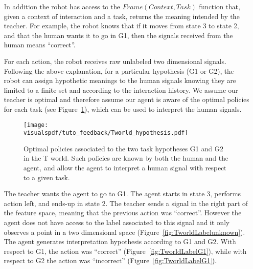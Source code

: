 In addition the robot has access to the $Frame(Context,Task)$ function that, given a context of interaction and a task, returns the meaning intended by the teacher. For example, the robot knows that if it moves from state 3 to state 2, and that the human wants it to go in G1, then the signals received from the human means ``correct''.


For each action, the robot receives raw unlabeled two dimensional signals. Following the above explanation, for a particular hypothesis (G1 or G2), the robot can assign hypothetic meanings to the human signals knowing they are limited to a finite set and according to the interaction history. We assume our teacher is optimal and therefore assume our agent is aware of the optimal policies for each task  (see Figure~\ref{fig:Twolrdpolicies}), which can be used to interpret the human signals.



\begin{figure}[!htbp]
  \centering
  \texttt{[image: \\visualspdf/tuto\_feedback/Tworld\_hypothesis.pdf]}
  \caption{Optimal policies associated to the two task hypotheses G1 and G2 in the T world. Such policies are known by both the human and the agent, and allow the agent to interpret a human signal with respect to a given task.}
  \label{fig:Twolrdpolicies}
\end{figure}

The teacher wants the agent to go to G1. The agent starts in state 3, performs action left, and ends-up in state 2. The teacher sends a signal in the right part of the feature space, meaning that the previous action was ``correct''. However the agent does not have access to the label associated to this signal and it only observes a point in a two dimensional space (Figure~\ref{fig:TworldLabelunknown}). The agent generates interpretation hypothesis according to G1 and G2. With respect to G1, the action was ``correct'' (Figure~\ref{fig:TworldLabelG1}), while with respect to G2 the action was ``incorrect'' (Figure~\ref{fig:TworldLabelG1}).

